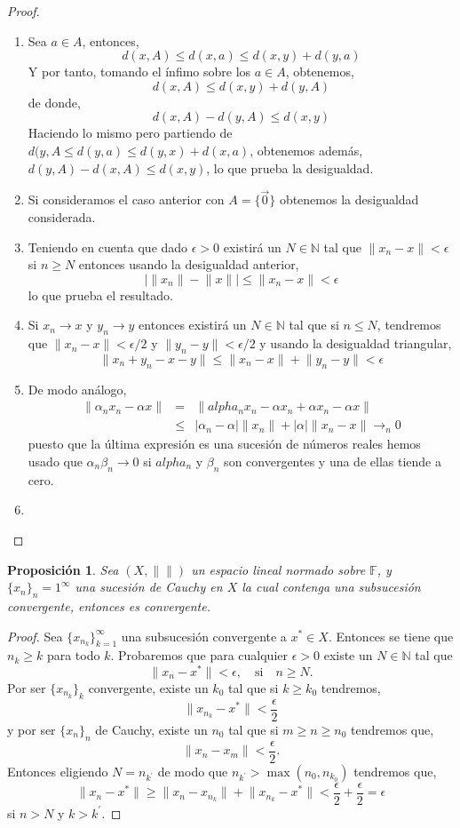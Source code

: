 \documentclass[12pt]{book}
\newtheorem{prop}{\bf Proposición}[chapter]
\begin{document}
\begin{proof}
\begin{enumerate}
\item Sea  $a\in A$, entonces,
$$d(x,A)\leq d(x,a)\leq d(x,y)+ d(y,a)$$
 Y por tanto, tomando el ínfimo sobre los $a\in A$, obtenemos,
 $$ d(x,A)\leq d(x,y) + d(y,A)$$
 de donde,
  $$ d(x,A)-d(y,A)\leq d(x,y)$$
  Haciendo lo mismo pero partiendo de $d(y,A\leq d(y,a)\leq d(y,x)+d(x,a)$, obtenemos además, 
$d(y,A) - d(x,A)\leq d(x,y)$, lo que prueba la desigualdad.
\item Si consideramos el caso anterior con $A=\{ \vec 0\}$ obtenemos la desigualdad considerada.
\item Teniendo en cuenta que dado $\epsilon>0$ existirá un $N\in \mathbb{N}$ tal que  $\lVert x_n-
x\rVert<\epsilon$ si $n\geq N$ entonces usando la desigualdad  anterior,
$$\lvert \lVert x_n\rVert-\lVert x\rVert\rvert\leq \lVert x_n-x\rVert<\epsilon$$
lo que prueba el resultado.
\item Si $x_n\to x$ y $y_n\to y$ entonces existirá un $N\in\mathbb{N}$ tal que si $n\leq N$, 
tendremos que $\lVert x_n-x\rVert<\epsilon/2$ y $\lVert y_n-y\rVert<\epsilon/2$ y usando la 
desigualdad triangular,
$$\lVert x_n+y_n-x-y\rVert\leq \lVert x_n-x\rVert+\lVert y_n-y\rVert<\epsilon$$
\item De modo análogo,
\begin{eqnarray*}
\lVert  \alpha_n x_n-\alpha x\rVert&=&\lVert alpha_n x_n -\alpha x_n +\alpha x_n -\alpha x\rVert\\
&\leq& \lvert \alpha_n-\alpha\rvert\lVert x_n\rVert+\lvert \alpha\rvert\lVert x_n-x\rVert\mathop{\to}_n 0
\end{eqnarray*}
puesto que la última expresión es una sucesión de números reales hemos usado que  $
\alpha_n\beta_n\to0$ si $alpha_n$ y $\beta_n$ son convergentes y una de ellas tiende a cero.
\item 
\end{enumerate}
\end{proof}
\begin{prop}
Sea $(X,\lVert \rVert )$ un espacio lineal normado  sobre $\mathbb{F}$, y $\{x_n\}_n=1^\infty$ una 
sucesión de Cauchy  en $X$ la cual  contenga una subsucesión convergente, entonces es 
convergente.
\end{prop}
\begin{proof}
Sea $\{x_{n_k}\}_{k=1}^\infty$ una subsucesión convergente a $x^*\in X$. Entonces se tiene que 
$n_k\geq k$ para todo $k$. Probaremos que para cualquier $\epsilon>0$ existe un $N\in 
\mathbb{N}$ tal que 
$$\lVert x_n-x^*\rVert <\epsilon,\quad \text{si}\quad n\geq N.$$
Por ser $\{x_{n_k}\}_k$ convergente, existe un $k_0$ tal que si $k\geq  k_0$ tendremos,
$$\lVert  x_{n_k} - x^*\rVert <\frac{\epsilon}{2}$$
y por ser $\{x_n\}_n$ de Cauchy,  existe un $n_0$ tal que si $m\geq n\geq n_0$ tendremos que,
$$\lVert x_n-x_m\rVert <\frac{\epsilon}{2}.$$
Entonces eligiendo $N=n_{k^\prime}$ de modo que $n_{k^\prime}> \max(n_0,n_{k_0})$ tendremos 
que,
$$\lVert x_n-x^*\rVert \geq \lVert x_n-x_{n_k}\rVert +\lVert x_{n_k}-x^*\rVert <\frac{\epsilon}{2}+
\frac{\epsilon}{2}=\epsilon$$
si  $n>N$ y $k>k^\prime$.
\end{proof}
\end{document}

